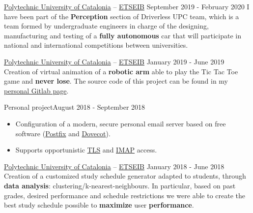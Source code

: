 \documentclass[10pt, a4paper, ragged2e]{../altacv}
\begin{document}
{\href{https://www.upc.edu/en}{Polytechnic University of Catalonia} --
\href{https://etseib.upc.edu/en}{ETSEIB}}
{September 2019 - February 2020}{}
I have been part of the \textbf{Perception} section of Driverless UPC team,
which is a team formed by undergraduate engineers in charge of the designing,
manufacturing and testing of a \textbf{fully autonomous} car that will
participate in national and international competitions between universities.

\divider

{\href{https://www.upc.edu/en}{Polytechnic University of Catalonia} --
\href{https://etseib.upc.edu/en}{ETSEIB}}
{January 2019 - June 2019}{}
Creation of virtual animation of a \textbf{robotic arm} able to play the Tic
Tac Toe game and \textbf{never lose}. The source code of this project can be
found in my \href{https://gitlab.com/DavidAlvarez/}{personal Gitlab
  page\footnotemark}.

\divider

{Personal project}{August 2018 - September 2018}{}
\begin{itemize}
  \item Configuration of a modern, secure personal email server based on
  free software (\href{http://www.postfix.org/}{Postfix} and
  \href{https://www.dovecot.org/}{Dovecot}).
  \item Supports opportunistic
  \href{https://en.wikipedia.org/wiki/Transport_Layer_Security}{TLS} and
  \href{https://en.wikipedia.org/wiki/Internet_Message_Access_Protocol}
  {IMAP} access.
\end{itemize}

\divider

{\href{https://www.upc.edu/en}{Polytechnic University of Catalonia} --
\href{https://etseib.upc.edu/en}{ETSEIB}}
{January 2018 - June 2018}{}
Creation of a customized study schedule generator adapted to students, through
\textbf{data analysis}: clustering/k-nearest-neighbours. In particular, based on
past grades, desired performance and schedule restrictions we were able to
create the best study schedule possible to \textbf{maximize} user
\textbf{performance}.

\medskip


\end{document}
